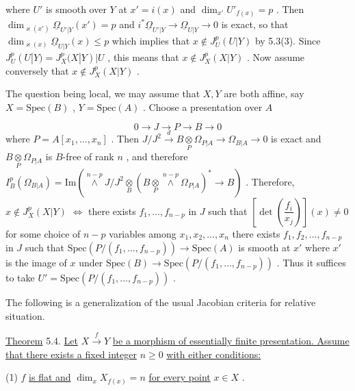 
where $U'$ is smooth over $Y$ at $x' = i(x)$ and $\dim_{x'}U'_{f(x)} = p$ . Then $\dim_{\varkappa(x')}\underline{\Omega}_{U'|Y}(x') = p$ and $i^{*}\underline{\Omega}_{U'|Y} \to \underline{\Omega}_{U|Y} \to 0$ is exact, so that $\dim_{\varkappa(x)}\underline{\Omega}_{U|Y}(x) \leq p$ which implies that $x \notin J^{p}_{U}(U|Y)$ by 5.3(3). Since $J^{p}_{U}(U|Y) = J^{p}_{X}(X|Y)|U$ , this means that $x \notin J^{p}_{X}(X|Y)$ . Now assume conversely that $x \notin J^{p}_{X}(X|Y)$ .

The question being local, we may assume that $X, Y$ are both affine, say $X = \mathrm{Spec}(B)$ , $Y = \mathrm{Spec}(A)$ . Choose a presentation over $A$

\begin{equation*}
0 \to J \to P \to B \to 0
\end{equation*}
where $P = A[x_1,\ldots,x_n]$ . Then $J/J^{2} \overset{d}{\to} B \underset{P}{\otimes} \Omega_{P|A} \to \Omega_{B|A} \to 0$ is exact and $B \underset{P}{\otimes} \Omega_{P|A}$ is $B$-free of rank $n$ , and therefore $I^{p}_{B}(\Omega_{B|A}) = \mathrm{Im}(\overset{n-p}{\wedge}J/J^{2} \underset{B}{\otimes} (B \underset{P}{\otimes} \overset{n-p}{\wedge}\Omega_{P|A})^{*} \to B)$ . Therefore, $x \notin J^{p}_{X}(X|Y)$ $\Leftrightarrow$ there exists $f_1,\ldots,f_{n-p}$ in $J$ such that $\left[\det\left(\dfrac{f_i}{x_j}\right)\right](x) \neq 0$ for some choice of $n-p$ variables among $x_1, x_2,\ldots,x_n$   there exists $f_1, f_2,\ldots,f_{n-p}$ in $J$ such that $\mathrm{Spec}(P/(f_1,\ldots,f_{n-p})) \to \mathrm{Spec}(A)$ is smooth at $x'$ where $x'$ is the image of $x$ under $\mathrm{Spec}(B) \to \mathrm{Spec}(P/(f_1,\ldots,f_{n-p}))$ . Thus it suffices to take $U' = \mathrm{Spec}(P/(f_1,\ldots,f_{n-p}))$ .

The following is a generalization of the usual Jacobian criteria for relative situation.

\underline{Theorem} 5.4.   \underline{Let} $X \overset{f}{\to} Y$ \underline{be a morphism of essentially finite presentation. Assume that there exists a fixed integer} $n \geq 0$ \underline{with either conditions:}

(1)  $f$  \underline{is flat and} $\dim_{x}X_{f(x)} = n$ \underline{for every point} $x \in X$ .

